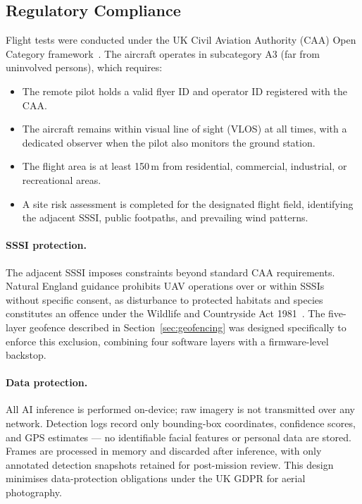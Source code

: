 \subsection{Regulatory Compliance}\label{sec:regulatory}

Flight tests were conducted under the UK Civil Aviation Authority (CAA) Open Category framework~\cite{caa2024uas}. The aircraft operates in subcategory A3 (far from uninvolved persons), which requires:

\begin{itemize}
    \item The remote pilot holds a valid flyer ID and operator ID registered with the CAA.
    \item The aircraft remains within visual line of sight (VLOS) at all times, with a dedicated observer when the pilot also monitors the ground station.
    \item The flight area is at least 150\,m from residential, commercial, industrial, or recreational areas.
    \item A site risk assessment is completed for the designated flight field, identifying the adjacent SSSI, public footpaths, and prevailing wind patterns.
\end{itemize}

\paragraph{SSSI protection.}
The adjacent SSSI imposes constraints beyond standard CAA requirements. Natural England guidance prohibits UAV operations over or within SSSIs without specific consent, as disturbance to protected habitats and species constitutes an offence under the Wildlife and Countryside Act 1981~\cite{wca1981}. The five-layer geofence described in Section~\ref{sec:geofencing} was designed specifically to enforce this exclusion, combining four software layers with a firmware-level backstop.

\paragraph{Data protection.}
All AI inference is performed on-device; raw imagery is not transmitted over any network. Detection logs record only bounding-box coordinates, confidence scores, and GPS estimates --- no identifiable facial features or personal data are stored. Frames are processed in memory and discarded after inference, with only annotated detection snapshots retained for post-mission review. This design minimises data-protection obligations under the UK GDPR for aerial photography.

